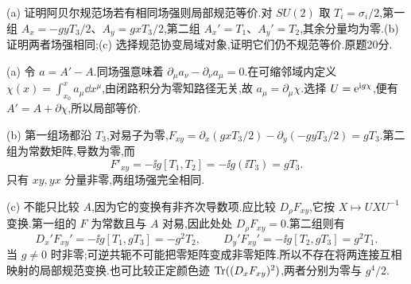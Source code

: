 \begin{exercise}
(a) 证明阿贝尔规范场若有相同场强则局部规范等价.对 $SU(2)$ 取 $T_i=\sigma_i/2$,第一组 $A_x=-gyT_3/2$、$A_y=gxT_3/2$,第二组 $A_x'=T_1$、$A_y'=T_2$,其余分量均为零.(b) 证明两者场强相同;(c) 选择规范协变局域对象,证明它们仍不规范等价.原题20分.
\end{exercise}
\begin{solution}
(a) 令 $a=A'-A$.同场强意味着 $\partial_\mu a_\nu-\partial_\nu a_\mu=0$.在可缩邻域内定义 $\chi(x)=\int_{x_0}^x a_\mu\dd x^\mu$,由闭路积分为零知路径无关,故 $a_\mu=\partial_\mu\chi$.选择 $U=\mathrm e^{\mathrm i g\chi}$,便有 $A'=A+\partial\chi$,所以局部等价.

(b) 第一组场都沿 $T_3$,对易子为零,$F_{xy}=\partial_x(gxT_3/2)-\partial_y(-gyT_3/2)=gT_3$.第二组为常数矩阵,导数为零,而
\[
F'_{xy}=-\ii g[T_1,T_2]=-\ii g(\ii T_3)=gT_3.
\]
只有 $xy,yx$ 分量非零,两组场强完全相同.

(c) 不能只比较 $A$,因为它的变换有非齐次导数项.应比较 $D_\rho F_{xy}$,它按 $X\mapsto UXU^{-1}$ 变换.第一组的 $F$ 为常数且与 $A$ 对易,因此处处 $D_\rho F_{xy}=0$.第二组则有
\[
D_x'F_{xy}'=-\ii g[T_1,gT_3]=-g^2T_2,
\qquad D_y'F_{xy}'=-\ii g[T_2,gT_3]=g^2T_1.
\]
当 $g\ne0$ 时非零;可逆共轭不可能把零矩阵变成非零矩阵.所以不存在将两连接互相映射的局部规范变换.也可比较正定颜色迹 $\operatorname{Tr}((D_xF_{xy})^2)$,两者分别为零与 $g^4/2$.
\end{solution}

